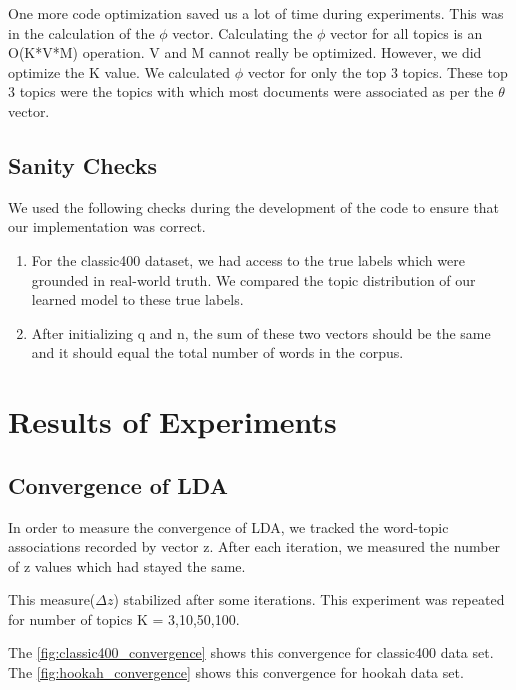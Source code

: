 \documentclass[11pt,a4paper,oneside]{article}
\begin{document}
\bigskip
One more code optimization saved us a lot of time during experiments. This was in the calculation of the $\phi$ vector. Calculating the $\phi$ vector for all topics is an O(K*V*M) operation. V and M cannot really be optimized. However, we did optimize the K value. We calculated $\phi$ vector for only the top 3 topics. These top 3 topics were the topics with which most documents were associated as per the $\theta$ vector.


\subsection{Sanity Checks}
We used the following checks during the development of the code to ensure that our implementation was correct.
\begin{enumerate}
\item For the classic400 dataset, we had access to the true labels which were grounded in real-world truth. We compared the topic distribution of our learned model to these true labels. 
\item After initializing q and n, the sum of these two vectors should be the same and it should equal the total number of words in the corpus.
\end{enumerate}

\section{Results of Experiments}
\label{sec:Results}

\subsection{Convergence of LDA}
In order to measure the convergence of LDA, we tracked the word-topic associations recorded by vector z. After each iteration, we measured the number of z values which had stayed the same. 

This measure($\Delta z$) stabilized after some iterations. This experiment was repeated for number of topics K = 3,10,50,100. 

The \ref{fig:classic400_convergence} shows this convergence for classic400 data set. The \ref{fig:hookah_convergence} shows this convergence for hookah data set.
\end{document}
